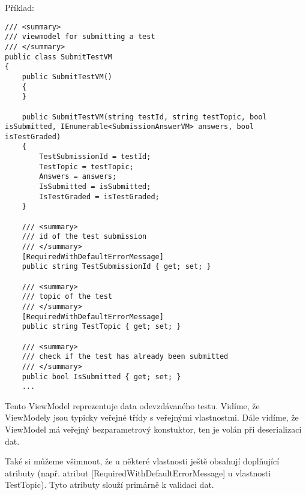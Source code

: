 Příklad:
\begin{lstlisting}
/// <summary>
/// viewmodel for submitting a test
/// </summary>
public class SubmitTestVM
{
	public SubmitTestVM()
	{
	}
	
	public SubmitTestVM(string testId, string testTopic, bool isSubmitted, IEnumerable<SubmissionAnswerVM> answers, bool isTestGraded)
	{
		TestSubmissionId = testId;
		TestTopic = testTopic;
		Answers = answers;
		IsSubmitted = isSubmitted;
		IsTestGraded = isTestGraded;
	}
	
	/// <summary>
	/// id of the test submission
	/// </summary>
	[RequiredWithDefaultErrorMessage]
	public string TestSubmissionId { get; set; }
	
	/// <summary>
	/// topic of the test
	/// </summary>
	[RequiredWithDefaultErrorMessage]
	public string TestTopic { get; set; }
	
	/// <summary>
	/// check if the test has already been submitted
	/// </summary>
	public bool IsSubmitted { get; set; }
	...
\end{lstlisting}

Tento ViewModel reprezentuje data odevzdávaného testu. Vidíme, že ViewModely jsou typicky veřejné třídy s veřejnými vlastnostmi. Dále vidíme, že ViewModel má veřejný bezparametrový konstuktor, ten je volán při deserializaci dat.

Také si můžeme všimnout, že u některé vlastnosti ještě obsahují doplňující atributy (např. atribut [RequiredWithDefaultErrorMessage] u vlastnosti TestTopic). Tyto atributy slouží primárně k validaci dat.

